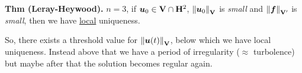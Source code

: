 \noindent\rlap{\rule[1.5ex]{0.495\textwidth}{.2pt}}

\vspace{-0.5em}

\textbf{Thm (Leray-Heywood).} $n=3$, if $\bm u_0 \in \mathbf{V}\cap \mathbf{H}^2$, $\left\lVert \bm u_0 \right\rVert_{\mathbf{V}}$ is \emph{small} and $\left\lVert \bm f \right\rVert_{\mathbf{V}'}$ is \emph{small}, then we have \underline{local} uniqueness.

\smallskip

So, there exists a threshold value for $\left\lVert \bm u(t) \right\rVert_{\mathbf{V}}$, below which we have local uniqueness. Instead above that we have a period of irregularity ($\approx$ turbolence) but maybe after that the solution becomes regular again.

\noindent\rlap{\rule[1.5ex]{0.495\textwidth}{.2pt}}

